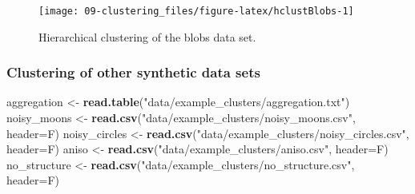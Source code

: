 \documentclass[]{book}
\newenvironment{Shaded}{\begin{snugshade}}{\end{snugshade}}
\newcommand{\KeywordTok}[1]{\textcolor[rgb]{0.13,0.29,0.53}{\textbf{{#1}}}}
\newcommand{\DataTypeTok}[1]{\textcolor[rgb]{0.13,0.29,0.53}{{#1}}}
\newcommand{\StringTok}[1]{\textcolor[rgb]{0.31,0.60,0.02}{{#1}}}
\newcommand{\NormalTok}[1]{{#1}}
\theoremstyle{definition}
\theoremstyle{definition}
\theoremstyle{definition}
\theoremstyle{remark}
\begin{document}
\begin{figure}

{\centering \texttt{[image: 09-clustering\_files/figure-latex/hclustBlobs-1]} 

}

\caption{Hierarchical clustering of the blobs data set.}\label{fig:hclustBlobs}
\end{figure}

\subsubsection{Clustering of other synthetic data
sets}\label{clustering-of-other-synthetic-data-sets}

\begin{Shaded}
\begin{Highlighting}[]
\NormalTok{aggregation <-}\StringTok{ }\KeywordTok{read.table}\NormalTok{(}\StringTok{"data/example_clusters/aggregation.txt"}\NormalTok{)}
\NormalTok{noisy_moons <-}\StringTok{ }\KeywordTok{read.csv}\NormalTok{(}\StringTok{"data/example_clusters/noisy_moons.csv"}\NormalTok{, }\DataTypeTok{header=}\NormalTok{F)}
\NormalTok{noisy_circles <-}\StringTok{ }\KeywordTok{read.csv}\NormalTok{(}\StringTok{"data/example_clusters/noisy_circles.csv"}\NormalTok{, }\DataTypeTok{header=}\NormalTok{F)}
\NormalTok{aniso <-}\StringTok{ }\KeywordTok{read.csv}\NormalTok{(}\StringTok{"data/example_clusters/aniso.csv"}\NormalTok{, }\DataTypeTok{header=}\NormalTok{F)}
\NormalTok{no_structure <-}\StringTok{ }\KeywordTok{read.csv}\NormalTok{(}\StringTok{"data/example_clusters/no_structure.csv"}\NormalTok{, }\DataTypeTok{header=}\NormalTok{F)}


\end{Highlighting}
\end{Shaded}
\end{document}
